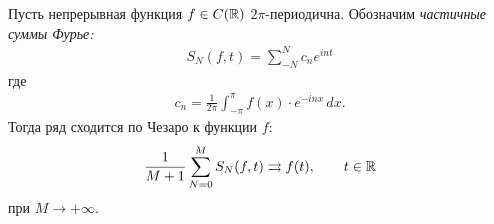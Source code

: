 \documentclass[../complex-analysis.tex]{subfiles}
\begin{document}
\begin{thm}[Фейера]
 \label{theorem:Feyer}
 Пусть непрерывная функция $ f \in C(\mathbb{R}) $ $ 2\pi $-периодична. Обозначим \emph{частичные суммы Фурье:}
 \begin{align}
  \label{eq:Partial Fourier Sums:Feyer Thm}
  S_{N} (f,t) = \sum_{-N}^{N} c_ne^{int}
 \end{align} где
 \begin{align*}
  c_n = \frac{1}{2\pi} \int_{-\pi}^{\pi} f(x) \cdot e^{-inx}\,dx.
 \end{align*} Тогда ряд сходится по Чезаро к функции $ f $:
 \begin{align}
  \label{eq:Cesaro Convergence:Thm Feyer}
  \frac{1}{M+1} \sum_{N=0}^{M} S_N(f,t) \rightrightarrows f(t), \qquad t \in \mathbb{R}
 \end{align} при $ M \to + \infty$.
\end{thm}
\end{document}
